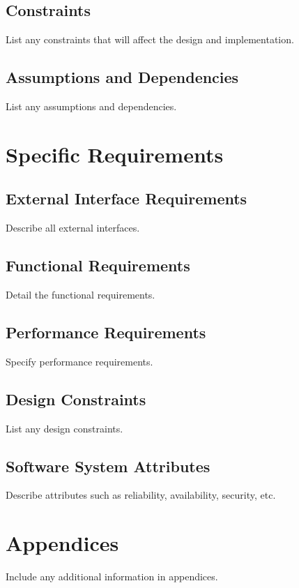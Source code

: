 \documentclass[a4paper,12pt]{article}
\begin{document}
\subsection{Constraints}
List any constraints that will affect the design and implementation.

\subsection{Assumptions and Dependencies}
List any assumptions and dependencies.

\section{Specific Requirements}
\subsection{External Interface Requirements}
Describe all external interfaces.

\subsection{Functional Requirements}
Detail the functional requirements.

\subsection{Performance Requirements}
Specify performance requirements.

\subsection{Design Constraints}
List any design constraints.

\subsection{Software System Attributes}
Describe attributes such as reliability, availability, security, etc.

\section{Appendices}
Include any additional information in appendices.
\end{document}
